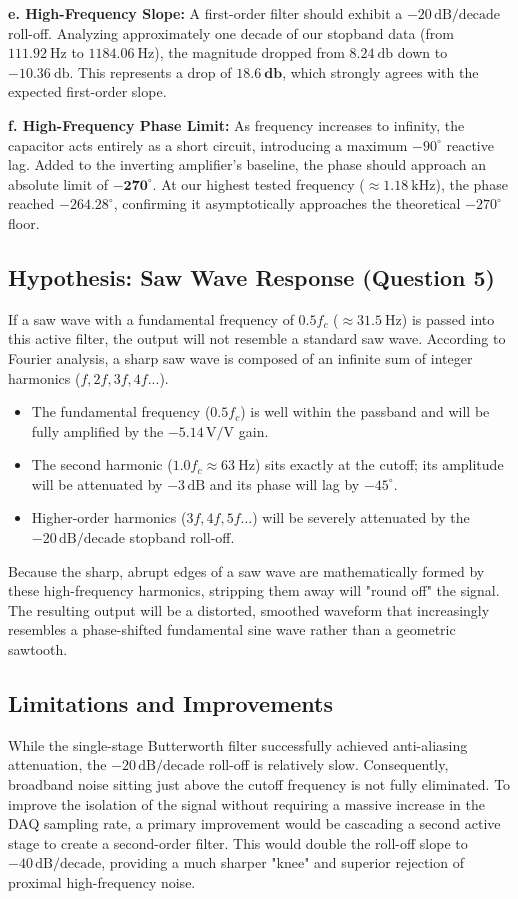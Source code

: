 \documentclass[11pt]{article}
\begin{document}
\textbf{e. High-Frequency Slope:} 
A first-order filter should exhibit a $-20\,\text{dB/decade}$ roll-off. Analyzing approximately one decade of our stopband data (from $\SI{111.92}{\hertz}$ to $\SI{1184.06}{\hertz}$), the magnitude dropped from $\SI{8.24}{\decibel}$ down to $\SI{-10.36}{\decibel}$. This represents a drop of $\mathbf{\SI{18.6}{\decibel}}$, which strongly agrees with the expected first-order slope.

\textbf{f. High-Frequency Phase Limit:} 
As frequency increases to infinity, the capacitor acts entirely as a short circuit, introducing a maximum $-90^\circ$ reactive lag. Added to the inverting amplifier's baseline, the phase should approach an absolute limit of $\mathbf{-270^\circ}$. At our highest tested frequency ($\approx \SI{1.18}{\kilo\hertz}$), the phase reached $\mathbf{-264.28^\circ}$, confirming it asymptotically approaches the theoretical $-270^\circ$ floor.

\subsection{Hypothesis: Saw Wave Response (Question 5)}
If a saw wave with a fundamental frequency of $0.5 f_c$ ($\approx \SI{31.5}{\hertz}$) is passed into this active filter, the output will not resemble a standard saw wave. According to Fourier analysis, a sharp saw wave is composed of an infinite sum of integer harmonics ($f, 2f, 3f, 4f...$). 
\begin{itemize}
    \item The fundamental frequency ($0.5 f_c$) is well within the passband and will be fully amplified by the $-5.14\,\text{V/V}$ gain.
    \item The second harmonic ($1.0 f_c \approx \SI{63}{\hertz}$) sits exactly at the cutoff; its amplitude will be attenuated by $-3\,\text{dB}$ and its phase will lag by $-45^\circ$.
    \item Higher-order harmonics ($3f, 4f, 5f...$) will be severely attenuated by the $-20\,\text{dB/decade}$ stopband roll-off.
\end{itemize}
Because the sharp, abrupt edges of a saw wave are mathematically formed by these high-frequency harmonics, stripping them away will "round off" the signal. The resulting output will be a distorted, smoothed waveform that increasingly resembles a phase-shifted fundamental sine wave rather than a geometric sawtooth.

\subsection{Limitations and Improvements}
While the single-stage Butterworth filter successfully achieved anti-aliasing attenuation, the $-20\,\text{dB/decade}$ roll-off is relatively slow. Consequently, broadband noise sitting just above the cutoff frequency is not fully eliminated. To improve the isolation of the signal without requiring a massive increase in the DAQ sampling rate, a primary improvement would be cascading a second active stage to create a second-order filter. This would double the roll-off slope to $-40\,\text{dB/decade}$, providing a much sharper "knee" and superior rejection of proximal high-frequency noise.
\end{document}
